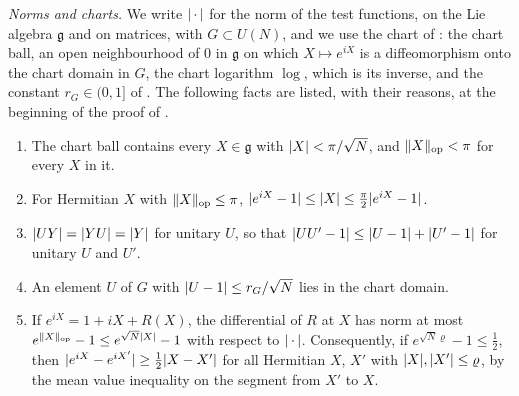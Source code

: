 \documentclass[11pt]{preprint}
\DeclarePairedDelimiter{\abs}{\lvert}{\rvert}
\DeclarePairedDelimiter{\norm}{\lVert}{\rVert}
\numberwithin{equation}{section}
\theoremstyle{definition}
\theoremstyle{remark}
\theoremstyle{plain}
\begin{document}
\emph{Norms and charts.} We write $\abs{\,\cdot\,}$ for the norm of the test functions, on the Lie algebra $\mathfrak g$ and on matrices, with $G \subset U(N)$, and we use the chart of \cite[Section~3]{WilsonFirstStep}: the chart ball, an open neighbourhood of $0$ in $\mathfrak g$ on which $X \mapsto e^{iX}$ is a diffeomorphism onto the chart domain in $G$, the chart logarithm $\log$, which is its inverse, and the constant $r_G \in (0, 1]$ of \cite[Appendix~B]{WilsonFirstStep}. The following facts are listed, with their reasons, at the beginning of the proof of \cite[Lemma~3.8]{WilsonFirstStep}.
\begin{enumerate}[label=(N\arabic*)]
\item The chart ball contains every $X \in \mathfrak g$ with $\abs X < \pi/\sqrt N$, and $\norm{X}_{\mathrm{op}} < \pi$ for every $X$ in it.
\item For Hermitian $X$ with $\norm{X}_{\mathrm{op}} \leq \pi$, $\abs{e^{iX} - 1} \leq \abs X \leq \frac{\pi}{2}\abs{e^{iX} - 1}$.
\item $\abs{UY} = \abs{YU} = \abs Y$ for unitary $U$, so that $\abs{UU' - 1} \leq \abs{U - 1} + \abs{U' - 1}$ for unitary $U$ and $U'$.
\item An element $U$ of $G$ with $\abs{U - 1} \leq r_G/\sqrt N$ lies in the chart domain.
\item If $e^{iX} = 1 + iX + R(X)$, the differential of $R$ at $X$ has norm at most $e^{\norm{X}_{\mathrm{op}}} - 1 \leq e^{\sqrt N\abs X} - 1$ with respect to $\abs{\,\cdot\,}$. Consequently, if $e^{\sqrt N\varrho} - 1 \leq \frac12$, then $\abs{e^{iX} - e^{iX'}} \geq \frac12\abs{X - X'}$ for all Hermitian $X$, $X'$ with $\abs X, \abs{X'} \leq \varrho$, by the mean value inequality on the segment from $X'$ to $X$.
\end{enumerate}
\end{document}
